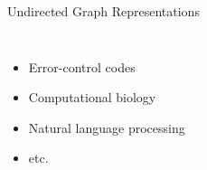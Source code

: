 \begin{frame}[label=current]{Undirected Graph Representations}
\begin{itemize}
\begin{columns}
        \begin{itemize}[label=$\bullet$]
        \item Error-control codes
        \item Computational biology
        \item Natural language processing
        \item etc.
        \end{itemize}
      \end{columns}
  \end{itemize}


\end{frame}


